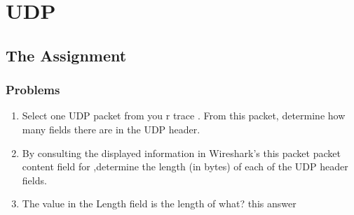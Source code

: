 \section{UDP}
\subsection{The Assignment}
    \subsubsection*{Problems}
    \begin{enumerate}[label=\bfseries Problem \arabic*:,leftmargin=*,labelindent=1em]
        \item Select one UDP packet from you r trace . From this packet, determine how many fields there are in the UDP header.\\[0.2mm]
        \soln
        \item By consulting the displayed information in Wireshark’s this packet packet content field for ,determine the length (in bytes) of each of the UDP header fields.\\[0.2mm]
        \soln
        \item The value in the Length field is the length of what? this answer\\[0.2mm]
        \soln

\end{enumerate}

